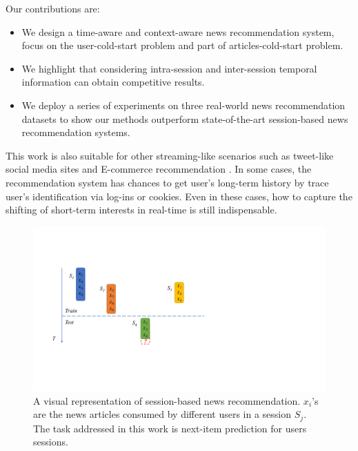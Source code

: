 Our contributions are:
\begin{itemize}
    \item We design a time-aware and context-aware news recommendation system, focus on the user-cold-start problem and part of articles-cold-start problem.
    \item We highlight that considering intra-session and inter-session temporal information can obtain competitive results. 
    \item We deploy a series of experiments on three real-world news recommendation datasets to show our methods outperform state-of-the-art session-based news recommendation systems.
\end{itemize}

This work is also suitable for other streaming-like scenarios such as tweet-like social media sites \cite{kwak_what_2010} and E-commerce recommendation \cite{li_learning_2018}. In some cases, the recommendation system has chances to get user's long-term history by trace user's identification via log-ins or cookies. Even in these cases, how to capture the shifting of short-term interests in real-time is still indispensable.

\begin{figure}[th]
    \centering
    \includegraphics[width=0.5\columnwidth]{fig/example.pdf}
    \caption{A visual representation of session-based news recommendation. 
$x_i$'s are the news articles consumed by different users in a session $S_j$. 
The task addressed in this work is next-item prediction for users sessions.}
    \label{fig:representation}
\end{figure}
